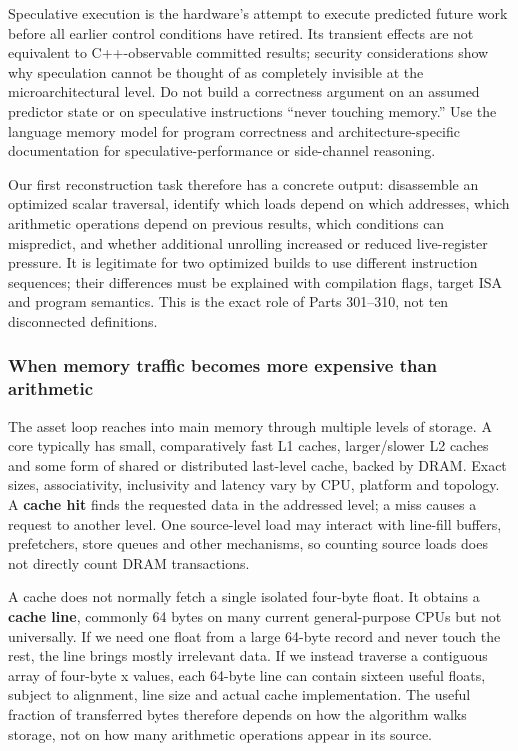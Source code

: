 Speculative execution is the hardware's attempt to execute predicted future work before all earlier control conditions have retired. Its transient effects are not equivalent to C++-observable committed results; security considerations show why speculation cannot be thought of as completely invisible at the microarchitectural level. Do not build a correctness argument on an assumed predictor state or on speculative instructions ``never touching memory.'' Use the language memory model for program correctness and architecture-specific documentation for speculative-performance or side-channel reasoning.

Our first reconstruction task therefore has a concrete output: disassemble an optimized scalar traversal, identify which loads depend on which addresses, which arithmetic operations depend on previous results, which conditions can mispredict, and whether additional unrolling increased or reduced live-register pressure. It is legitimate for two optimized builds to use different instruction sequences; their differences must be explained with compilation flags, target ISA and program semantics. This is the exact role of Parts 301--310, not ten disconnected definitions.

\subsubsection{When memory traffic becomes more expensive than arithmetic}\label{when-memory-traffic-becomes-more-expensive-than-arithmetic}

The asset loop reaches into main memory through multiple levels of storage. A core typically has small, comparatively fast L1 caches, larger/slower L2 caches and some form of shared or distributed last-level cache, backed by DRAM. Exact sizes, associativity, inclusivity and latency vary by CPU, platform and topology. A \textbf{cache hit} finds the requested data in the addressed level; a miss causes a request to another level. One source-level load may interact with line-fill buffers, prefetchers, store queues and other mechanisms, so counting source loads does not directly count DRAM transactions.

A cache does not normally fetch a single isolated four-byte float. It obtains a \textbf{cache line}, commonly 64 bytes on many current general-purpose CPUs but not universally. If we need one float from a large 64-byte record and never touch the rest, the line brings mostly irrelevant data. If we instead traverse a contiguous array of four-byte x values, each 64-byte line can contain sixteen useful floats, subject to alignment, line size and actual cache implementation. The useful fraction of transferred bytes therefore depends on how the algorithm walks storage, not on how many arithmetic operations appear in its source.

